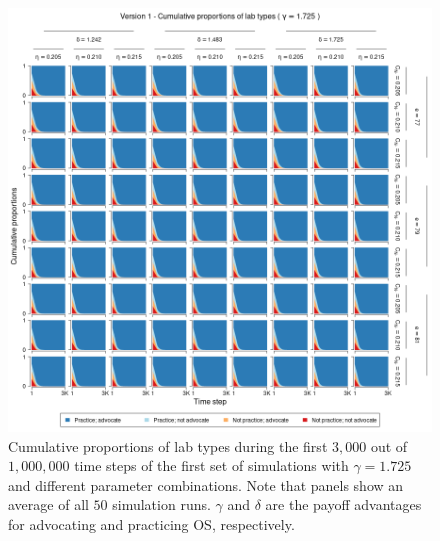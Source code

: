 \documentclass[meta, authordate]{jote-new-article}
\begin{document}
\begin{figure}
  \begin{fullwidth}
    \centering
    \includegraphics[width=\textwidth]{v1_pro_plot_sens_payypro1.725.png}
    \caption{Cumulative proportions of lab types during the first $3,000$ out of $1,000,000$ time steps of the first set of simulations with $\gamma=1.725$ and different parameter combinations. Note that panels show an average of all $50$ simulation runs. $\gamma$ and $\delta$ are the payoff advantages for advocating and practicing OS, respectively.}
    \label{fig:v1_pro_plot_sens_payypro1.725}
  \end{fullwidth}
\end{figure}
%
%
\end{document}
